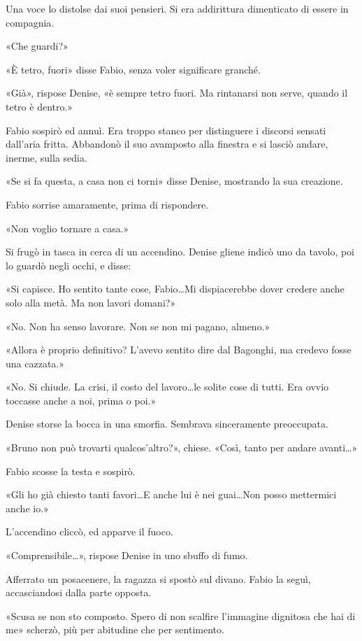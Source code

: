 Una voce lo distolse dai suoi pensieri. Si era addirittura dimenticato di essere in compagnia.

«Che guardi?»

«È tetro, fuori» disse Fabio, senza voler significare granché.

«Già», rispose Denise, «è sempre tetro fuori. Ma rintanarsi non serve, quando il tetro è dentro.»

Fabio sospirò ed annuì. Era troppo stanco per distinguere i discorsi sensati dall'aria fritta. Abbandonò il suo avamposto alla finestra e si lasciò andare, inerme, sulla sedia.

«Se si fa questa, a casa non ci torni» disse Denise, mostrando la sua creazione.

Fabio sorrise amaramente, prima di rispondere.

«Non voglio tornare a casa.»

Si frugò in tasca in cerca di un accendino. Denise gliene indicò uno da tavolo, poi lo guardò negli occhi, e disse:

«Si capisce. Ho sentito tante cose, Fabio\ldots Mi dispiacerebbe dover credere anche solo alla metà. Ma non lavori domani?»

«No. Non ha senso lavorare. Non se non mi pagano, almeno.»

«Allora è proprio definitivo? L'avevo sentito dire dal Bagonghi, ma credevo fosse una cazzata.»

«No. Si chiude. La crisi, il costo del lavoro\ldots le solite cose di tutti. Era ovvio toccasse anche a noi, prima o poi.»

Denise storse la bocca in una smorfia. Sembrava sinceramente preoccupata.

«Bruno non può trovarti qualcos'altro?», chiese. «Così, tanto per andare avanti\ldots»

Fabio scosse la testa e sospirò.

«Gli ho già chiesto tanti favori\ldots E anche lui è nei guai\ldots Non posso mettermici anche io.»

L'accendino cliccò, ed apparve il fuoco.

«Comprensibile\ldots», rispose Denise in uno sbuffo di fumo.

Afferrato un posacenere, la ragazza si spostò sul divano. Fabio la seguì, accasciandosi dalla parte opposta.

«Scusa se non sto composto. Spero di non scalfire l'immagine dignitosa che hai di me» scherzò, più per abitudine che per sentimento.

